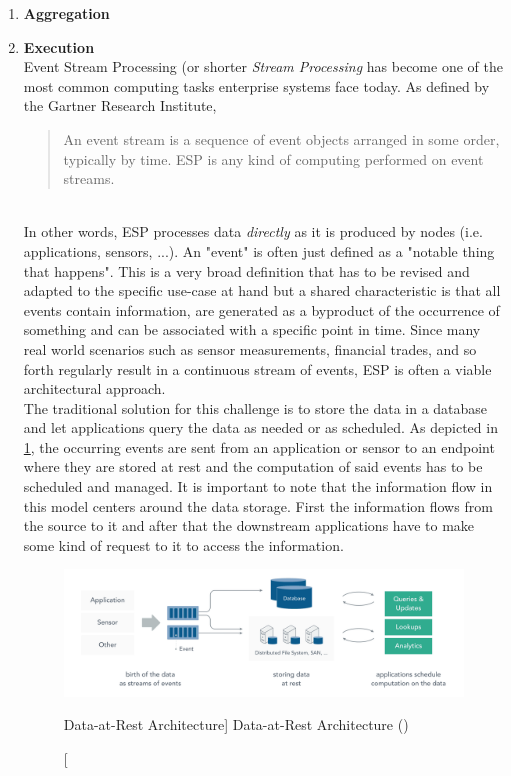 \begin{enumerate}
    \item
    \textbf{Aggregation}\\
    
    \item
    \textbf{Execution}\\
    Event Stream Processing (or shorter \textit{Stream Processing} has become one of the most common computing tasks enterprise systems face today. As defined by the Gartner Research Institute,
    \blockquote{An event stream is a sequence of event objects arranged in some order, typically by time. \acf{ESP} is any kind of computing performed on event streams.}\autocite{Schulte2017TechnologyProcessing}\\
    In other words, \acf{ESP} processes data \textit{directly} as it is produced by nodes (i.e. applications, sensors, ...). An "event" is often just defined as a "notable thing that happens".\autocite{Group2006Event-DrivenOverview} This is a very broad definition that has to be revised and adapted to the specific use-case at hand but a shared characteristic is that all events contain information, are generated as a byproduct of the occurrence of something and can be associated with a specific point in time. 
    Since many real world scenarios such as sensor measurements, financial trades, and so forth regularly result in a continuous stream of events, \acf{ESP} is often a viable architectural approach.\\
    The traditional solution for this challenge is to store the data in a database and let applications query the data as needed or as scheduled. As depicted in \ref{fig:dataRest}, the occurring events are sent from an application or sensor to an endpoint where they are stored at rest and the computation of said events has to be scheduled and managed. It is important to note that the information flow in this model centers around the data storage. First the information flows from the source to it and after that the downstream applications have to make some kind of request to it to access the information.
    
    \begin{figure}[ht]
        \includegraphics[width=\linewidth]{images/streaming/data_at_rest.png}\centering
        \caption
        [Data-at-Rest Architecture]
        {Data-at-Rest Architecture (\cite{dataArtisans2017WhatProcessing})}
        \label{fig:dataRest}
    \end{figure}
    

\end{enumerate}
